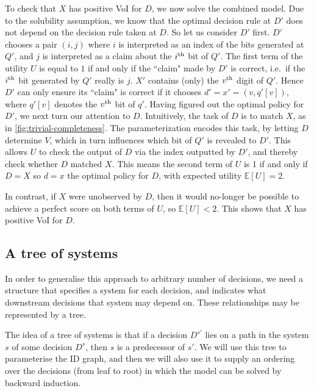 To check that $X$ has positive VoI for $D$, we now solve the combined model.
Due to the solubility assumption, we know that the optimal 
decision rule at $D'$ does not depend on the decision rule taken at $D$.
So let us consider $D'$ first.
$D'$ chooses a pair $(i, j)$ where $i$ is interpreted as an index of the bits generated at $Q'$, and $j$ is interpreted as a claim about the $i\textsuperscript{th}$ bit of $Q'$.
The first term of the utility $U$ is equal to $1$ if and only if the ``claim" made by $D'$ is correct, i.e.\ if the $i\textsuperscript{th}$ bit generated by $Q'$ really is $j$.
$X'$ contains (only) the $v\textsuperscript{th}$ digit of $Q'$.
Hence $D'$ can only ensure its ``claim" is correct if it chooses $d'=x'=(v,q'[v])$, 
where $q'[v]$ denotes the $v\textsuperscript{th}$ bit of $q'$.
Having figured out the optimal policy for $D'$, we next turn our attention to $D$.
Intuitively, the task of $D$ is to match $X$, as in \cref{fig:trivial-completeness}.
The parameterization encodes this task, by letting $D$ determine $V$, which in turn influences which bit of $Q'$ is revealed to $D'$.
This allows $U$ to check the output of $D$ via the index outputted by $D'$, and thereby check whether $D$ matched $X$.
This means the second term of $U$ is 1 if and only if $D=X$
so $d=x$ the optimal policy for $D$, with expected utility $\mathbb{E}[U]=2$.

In contrast, if $X$ were unobserved by $D$, then it would no-longer be possible to achieve a perfect score on both terms of $U$, so $\mathbb{E}[U]<2$.
This shows that $X$ has positive VoI for $D$.

\subsection{A tree of systems} \label{sec:tree-main}


In order to generalise this approach to arbitrary number of decisions, 
we 
need a structure that specifies a system for each decision, and indicates 
what downstream decisions that system may depend on.
These relationships may be represented by a tree.~





The idea of a tree of systems is that 
if a decision $D^{s'}$ lies on a path in the system $s$ 
of some decision $D^s$, then $s$ is a predecessor of $s'$.
We will use this tree to parameterise the ID graph,
and then we will also use it to supply an ordering over the decisions 
(from leaf to root) in which the model can be solved by backward induction.

